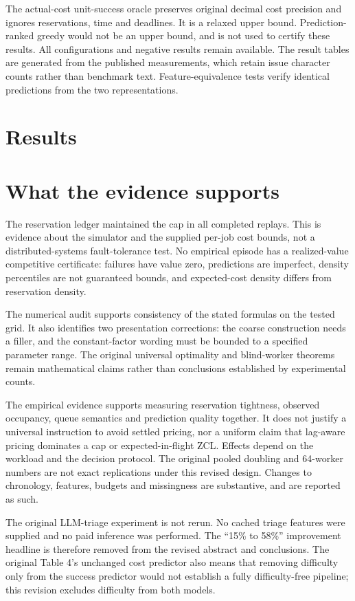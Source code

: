 \documentclass[11pt]{article}
\begin{document}
The actual-cost unit-success oracle preserves original decimal cost precision and ignores reservations, time and deadlines. It is a relaxed upper bound. Prediction-ranked greedy would not be an upper bound, and is not used to certify these results. All configurations and negative results remain available. The result tables are generated from the published measurements, which retain issue character counts rather than benchmark text. Feature-equivalence tests verify identical predictions from the two representations.

\section{Results}

\section{What the evidence supports}
The reservation ledger maintained the cap in all completed replays. This is evidence about the simulator and the supplied per-job cost bounds, not a distributed-systems fault-tolerance test. No empirical episode has a realized-value competitive certificate: failures have value zero, predictions are imperfect, density percentiles are not guaranteed bounds, and expected-cost density differs from reservation density.

The numerical audit supports consistency of the stated formulas on the tested grid. It also identifies two presentation corrections: the coarse construction needs a filler, and the constant-factor wording must be bounded to a specified parameter range. The original universal optimality and blind-worker theorems remain mathematical claims rather than conclusions established by experimental counts.

The empirical evidence supports measuring reservation tightness, observed occupancy, queue semantics and prediction quality together. It does not justify a universal instruction to avoid settled pricing, nor a uniform claim that lag-aware pricing dominates a cap or expected-in-flight ZCL. Effects depend on the workload and the decision protocol. The original pooled doubling and 64-worker numbers are not exact replications under this revised design. Changes to chronology, features, budgets and missingness are substantive, and are reported as such.

The original LLM-triage experiment is not rerun. No cached triage features were supplied and no paid inference was performed. The ``15\% to 58\%'' improvement headline is therefore removed from the revised abstract and conclusions. The original Table 4's unchanged cost predictor also means that removing difficulty only from the success predictor would not establish a fully difficulty-free pipeline; this revision excludes difficulty from both models.
\end{document}
